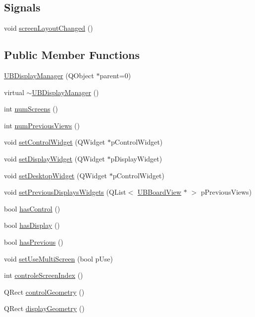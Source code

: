 \subsection*{Signals}
\begin{DoxyCompactItemize}
\item 
void \hyperlink{class_u_b_display_manager_a8220ab5aebf94b5b596db35b4c9b767f}{screen\-Layout\-Changed} ()
\end{DoxyCompactItemize}
\subsection*{Public Member Functions}
\begin{DoxyCompactItemize}
\item 
\hyperlink{class_u_b_display_manager_a4f83c8788c9fb53294b037d9ccfcf1a4}{U\-B\-Display\-Manager} (Q\-Object $\ast$parent=0)
\item 
virtual \hyperlink{class_u_b_display_manager_a2bc7eb042fede764c12a300dfa00830b}{$\sim$\-U\-B\-Display\-Manager} ()
\item 
int \hyperlink{class_u_b_display_manager_a6e992c0a4a0042501c94b218328529d4}{num\-Screens} ()
\item 
int \hyperlink{class_u_b_display_manager_ad6dc1d98fb11aeb8b42695216ed925f2}{num\-Previous\-Views} ()
\item 
void \hyperlink{class_u_b_display_manager_a8b704ad13b84eb0353814ff4113b8e85}{set\-Control\-Widget} (Q\-Widget $\ast$p\-Control\-Widget)
\item 
void \hyperlink{class_u_b_display_manager_a621254d8cb7ab7967cdab619c76962f5}{set\-Display\-Widget} (Q\-Widget $\ast$p\-Display\-Widget)
\item 
void \hyperlink{class_u_b_display_manager_a28e33f53af270ad368f70c705380fb6b}{set\-Desktop\-Widget} (Q\-Widget $\ast$p\-Control\-Widget)
\item 
void \hyperlink{class_u_b_display_manager_ae0930b6418b998eddc3dae6ca0e835d3}{set\-Previous\-Displays\-Widgets} (Q\-List$<$ \hyperlink{class_u_b_board_view}{U\-B\-Board\-View} $\ast$ $>$ p\-Previous\-Views)
\item 
bool \hyperlink{class_u_b_display_manager_aeaddf24885b0612083da8b4045a35847}{has\-Control} ()
\item 
bool \hyperlink{class_u_b_display_manager_a00a31e92ba05b878aca9978ebc45a6cf}{has\-Display} ()
\item 
bool \hyperlink{class_u_b_display_manager_a2d743afe108d8b8b408c48c77be7d78a}{has\-Previous} ()
\item 
void \hyperlink{class_u_b_display_manager_a89345c872ad8abfdde371811d10b7044}{set\-Use\-Multi\-Screen} (bool p\-Use)
\item 
int \hyperlink{class_u_b_display_manager_ac8b7e7f0a2fbdbe631b4321b7d324f2a}{controle\-Screen\-Index} ()
\item 
Q\-Rect \hyperlink{class_u_b_display_manager_aee84a994758fbdbcc1119681c41c66c8}{control\-Geometry} ()
\item 
Q\-Rect \hyperlink{class_u_b_display_manager_a8e1cf8cf19164e7707a4c25c4ca08bba}{display\-Geometry} ()
\end{DoxyCompactItemize}



